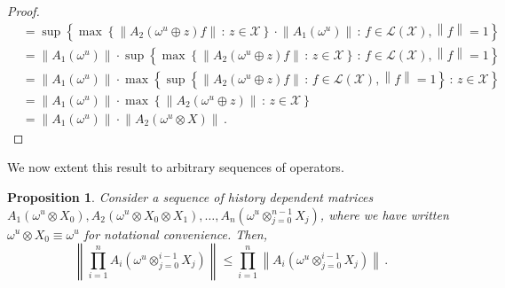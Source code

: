 \documentclass[a4paper,reqno]{amsart}
\newtheorem{proposition}[theorem]{Proposition}
\newcommand{\states}{\mathcal{X}}
\newcommand{\gambles}{\mathcal{L}}
\newcommand{\gamblesX}{\gambles(\states)}
\newcommand{\norm}[1]{\left\lVert #1 \right\rVert}
\begin{document}
\begin{proof}
\begin{align*}
 &= \sup\left\{\max\left\{\norm{A_2(\omega^u\oplus z)f}\,:\,z\in\states\right\}\cdot \norm{A_1(\omega^u)}\,:\,f\in\gamblesX, \norm{f}=1\right\} \\
 &= \norm{A_1(\omega^u)}\cdot \sup\left\{\max\left\{\norm{A_2(\omega^u\oplus z)f}\,:\,z\in\states\right\} \,:\,f\in\gamblesX, \norm{f}=1\right\} \\
 &= \norm{A_1(\omega^u)}\cdot \max\left\{\sup\left\{\norm{A_2(\omega^u\oplus z)f} \,:\,f\in\gamblesX, \norm{f}=1\right\}\,:\,z\in\states\right\} \\
 &= \norm{A_1(\omega^u)}\cdot \max\left\{\norm{A_2(\omega^u\oplus z)}\,:\,z\in\states\right\} \\
 &= \norm{A_1(\omega^u)}\cdot \norm{A_2(\omega^u\otimes X)}\,.
\end{align*}
\end{proof}
We now extent this result to arbitrary sequences of operators.
\begin{proposition}
Consider a sequence of history dependent matrices $A_1(\omega^u\otimes X_0),A_2(\omega^u\otimes X_0\otimes X_1),\ldots,A_n(\omega^u\otimes_{j=0}^{n-1}X_j)$, where we have written $\omega^u\otimes X_0\equiv \omega^u$ for notational convenience. Then,
\begin{equation*}
\norm{\prod_{i=1}^n A_i(\omega^u\otimes_{j=0}^{i-1}X_j)} \leq \prod_{i=1}^{n} \norm{A_i(\omega^u\otimes_{j=0}^{i-1}X_j)}\,.
\end{equation*}
\end{proposition}
\end{document}
